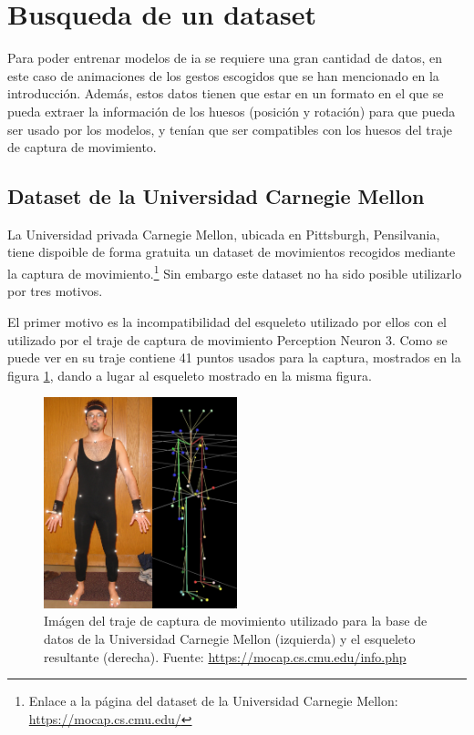 \section{Busqueda de un dataset}
\label{sec:busquedaDataset}
Para poder entrenar modelos de \gls{ia} se requiere una gran cantidad de datos, en este caso de animaciones de los gestos escogidos que se han mencionado en la introducción.
Además, estos datos tienen que estar en un formato en el que se pueda extraer la información de los huesos (posición y rotación) para que pueda ser usado por los modelos, y tenían que ser compatibles con los huesos del traje de captura de movimiento.

\subsection{Dataset de la Universidad Carnegie Mellon}
La Universidad privada Carnegie Mellon, ubicada en Pittsburgh, Pensilvania, tiene dispoible de forma gratuita un dataset de movimientos recogidos mediante la captura de movimiento.\footnote{Enlace a la página del dataset de la Universidad Carnegie Mellon: \url{https://mocap.cs.cmu.edu/}}
Sin embargo este dataset no ha sido posible utilizarlo por tres motivos.

El primer motivo es la incompatibilidad del esqueleto utilizado por ellos con el utilizado por el traje de captura de movimiento Perception Neuron 3.
Como se puede ver en \cite{MCUINFO} su traje contiene 41 puntos usados para la captura, mostrados en la figura \ref{fig:MCUTraje}, dando a lugar al esqueleto mostrado en la misma figura.

\begin{figure}[H]
	\centering
	\includegraphics[width=0.5\textwidth]{Imagenes/Vectorial/TrajeMCU.pdf}
	\caption{Imágen del traje de captura de movimiento utilizado para la base de datos de la Universidad Carnegie Mellon (izquierda) y el esqueleto resultante (derecha). Fuente: \url{https://mocap.cs.cmu.edu/info.php}}
	\label{fig:MCUTraje}
\end{figure}


